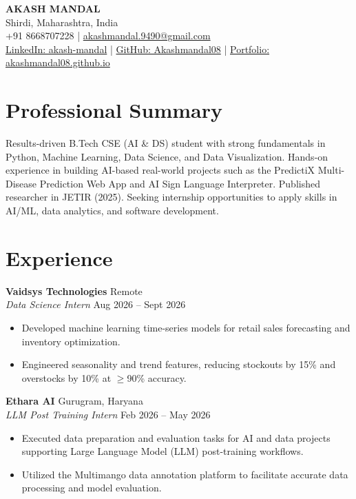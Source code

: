 \documentclass[10pt,letterpaper]{article}
\begin{document}
\begin{center}
    {\Huge \textbf{AKASH MANDAL}} \\ \vspace{3pt}
    Shirdi, Maharashtra, India \\
    +91 8668707228 | \href{mailto:akashmandal.9490@gmail.com}{akashmandal.9490@gmail.com} \\
    \href{https://www.linkedin.com/in/akash-mandal-8a7277320/}{LinkedIn: akash-mandal} | \href{https://github.com/Akashmandal08}{GitHub: Akashmandal08} | \href{https://akashmandal08.github.io/Portfolio/}{Portfolio: akashmandal08.github.io}
\end{center}

\section*{Professional Summary}
Results-driven B.Tech CSE (AI \& DS) student with strong fundamentals in Python, Machine Learning, Data Science, and Data Visualization. Hands-on experience in building AI-based real-world projects such as the PredictiX Multi-Disease Prediction Web App and AI Sign Language Interpreter. Published researcher in JETIR (2025). Seeking internship opportunities to apply skills in AI/ML, data analytics, and software development.

\section*{Experience}

\noindent \textbf{Vaidsys Technologies} \hfill Remote \\
\textit{Data Science Intern} \hfill Aug 2026 -- Sept 2026
\begin{itemize}[noitemsep, topsep=0pt, leftmargin=1.5em]
    \item Developed machine learning time-series models for retail sales forecasting and inventory optimization.
    \item Engineered seasonality and trend features, reducing stockouts by 15\% and overstocks by 10\% at $\ge$90\% accuracy.
\end{itemize}

\vspace{2pt}

\noindent \textbf{Ethara AI} \hfill Gurugram, Haryana \\
\textit{LLM Post Training Intern} \hfill Feb 2026 -- May 2026
\begin{itemize}[noitemsep, topsep=0pt, leftmargin=1.5em]
    \item Executed data preparation and evaluation tasks for AI and data projects supporting Large Language Model (LLM) post-training workflows.
    \item Utilized the Multimango data annotation platform to facilitate accurate data processing and model evaluation.
\end{itemize}
\end{document}

